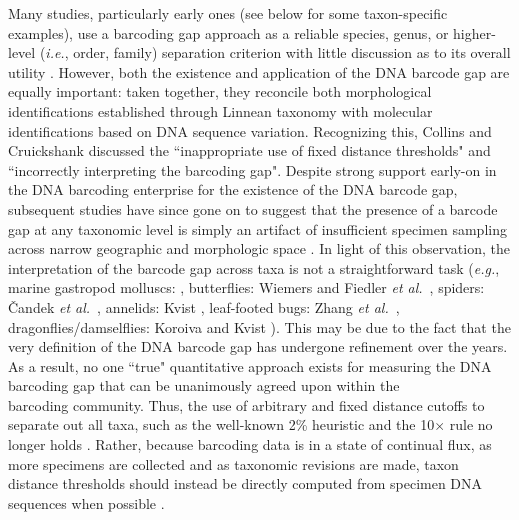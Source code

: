 Many studies, particularly early ones (see below for some taxon-specific examples), use a barcoding gap approach as a reliable species, genus, or higher-level (\textit{i.e.}, order, family) separation criterion with little discussion as to its overall utility \cite{candek2015dna}. However, both the existence and application of the DNA barcode gap are equally important: taken together, they reconcile both morphological identifications established through Linnean taxonomy with molecular identifications based on DNA sequence variation. Recognizing this, Collins and Cruickshank \cite{collins2013seven} discussed the ``inappropriate use of fixed distance thresholds" and ``incorrectly interpreting the barcoding gap". Despite strong support early-on in the DNA barcoding enterprise for the existence of the DNA barcode gap, subsequent studies have since gone on to suggest that the presence of a barcode gap at any taxonomic level is simply an artifact of insufficient specimen sampling across narrow geographic and morphologic space \cite{bergsten2012effect, candek2015dna, dasmahapatra2010mitochondrial}. In light of this observation, the interpretation of the barcode gap across taxa is not a straightforward task (\textit{e.g.}, marine gastropod molluscs: \cite{meyer2005dna}, butterflies: Wiemers and Fiedler \textit{et al.}~\cite{wiemers2007does}, spiders: {\v{C}}andek \textit{et al.}~\cite{candek2015dna}, annelids: Kvist \cite{kvist2017does}, leaf-footed bugs: Zhang \textit{et al.}~\cite{zhang2017species}, dragonflies/damselflies: Koroiva and Kvist \cite{koroiva2018estimating}). This may be due to the fact that the very definition of the DNA barcode gap has undergone refinement over the years. As a result, no one ``true" quantitative approach exists for measuring the DNA barcoding gap that can be unanimously agreed upon within the \\ barcoding community. Thus, the use of arbitrary and fixed distance cutoffs to separate out all taxa, such as the well-known 2\% heuristic \cite{hebert2003biological, hebert2003barcoding} and the 10$\times$ rule \cite{hebert2004identification} no longer holds \cite{collins2014known, zhang2017species}. Rather, because barcoding data is in a state of continual flux, as more specimens are collected and as taxonomic revisions are made, taxon distance thresholds should instead be directly computed from specimen DNA sequences when possible \cite{collins2013seven, young2017barcode}. 


